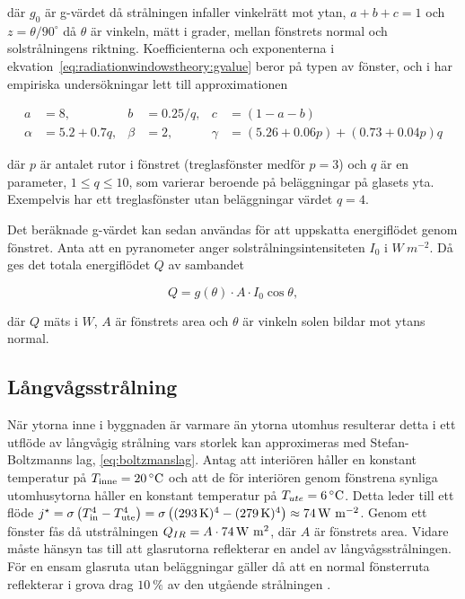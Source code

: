 där $g_0$ är g-värdet då strålningen infaller vinkelrätt mot ytan, $a+b+c=1$ och $z=\theta/90^\circ$ då $\theta$ är vinkeln, mätt i grader, mellan fönstrets normal och solstrålningens riktning. Koefficienterna och exponenterna i ekvation~\eqref{eq:radiationwindowstheory:gvalue} beror på typen av fönster, och i \cite{karlssonroos99} har empiriska undersökningar lett till approximationen

\begin{align}\label{eq:gconstants}
a & = 8, & b & = 0.25/q, & c & = (1-a-b) \nonumber \\
\alpha & = 5.2 + 0.7q, & \beta & = 2, & \gamma & = (5.26+0.06p) + (0.73+0.04p)q
\end{align}

där $p$ är antalet rutor i fönstret (treglasfönster medför $p = 3$) och $q$ är en parameter, $1 \le q \le 10$, som varierar beroende på beläggningar på glasets yta. Exempelvis har ett treglasfönster utan beläggningar värdet $q=4$.

Det beräknade g-värdet kan sedan användas för att uppskatta energiflödet genom fönstret. Anta att en pyranometer anger solstrålningsintensiteten $I_0$ i $\unit{W~m^{-2}}$. Då ges det totala energiflödet $Q$ av sambandet 

\begin{equation}\label{eq:totalsun}
Q = g \left( \theta \right)\cdot A \cdot I_0 \cos{\theta},
\end{equation}

där $Q$ mäts i $\unit{W}$, $A$ är fönstrets area och $\theta$ är vinkeln solen bildar mot ytans normal.

\subsection{Långvågsstrålning}\label{IR}

När ytorna inne i byggnaden är varmare än ytorna utomhus resulterar detta i ett utflöde av långvågig strålning vars storlek kan approximeras med Stefan-Boltzmanns lag, \ref{eq:boltzmanslag}. Antag att interiören håller en konstant temperatur på $T_\text{inne} = \unit[20]{^{\circ}C}$ och att de för interiören genom fönstrena synliga utomhusytorna håller en konstant temperatur på $T_{ute} = \unit[6]{^{\circ}C}$. Detta leder till ett flöde $j^{\star} = \sigma \left( T_\text{in}^{4}-T_\text{ute}^4\right) = \sigma \left( (\unit[293]{K})^4-(\unit[279]{K})^4 \right) \approx \unit[74]{W~m^{-2}}$. Genom ett fönster fås då utstrålningen $Q_{IR}=A\cdot\unit[74]{W~m^2}$, där $A$ är fönstrets area. Vidare måste hänsyn tas till att glasrutorna reflekterar en andel av långvågsstrålningen. För en ensam glasruta utan beläggningar gäller då att en normal fönsterruta reflekterar i grova drag $10~\%$ av den utgående strålningen \cite{gelin05}.

